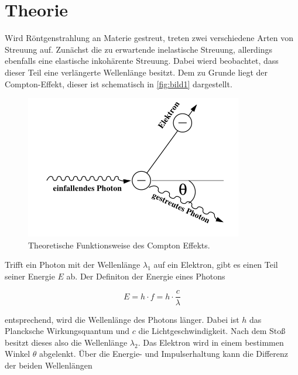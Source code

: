 \section{Theorie}
\label{sec:Theorie}

Wird Röntgenstrahlung an Materie gestreut, treten zwei verschiedene Arten von Streuung auf.
Zunächst die zu erwartende inelastische Streuung, allerdings ebenfalls eine elastische inkohärente Streuung.
Dabei wierd beobachtet, dass dieser Teil eine verlängerte Wellenlänge besitzt.
Dem zu Grunde liegt der Compton-Effekt, dieser ist schematisch in \autoref{fig:bild1} dargestellt.

\begin{figure}
    \centering
    \includegraphics[width=\textwidth/2]{images/bild1.png}
    \caption{Theoretische Funktionsweise des Compton Effekts. \cite{V603}}
    \label{fig:bild1}
\end{figure}

Trifft ein Photon mit der Wellenlänge $\lambda _1$ auf ein Elektron, gibt es einen Teil seiner Energie $E$ ab.
Der Definiton der Energie eines Photons

\begin{equation}
    E = h \cdot f = h \cdot \frac{c}{\lambda}
    \label{eq:energie}
\end{equation}

entsprechend, wird die Wellenlänge des Photons länger.
Dabei ist $h$ das Plancksche Wirkungsquantum und $c$ die Lichtgeschwindigkeit.
Nach dem Stoß besitzt dieses also die Wellenlänge $\lambda _2$.
Das Elektron wird in einem bestimmen Winkel $\theta$ abgelenkt.
Über die Energie- und Impulserhaltung kann die Differenz der beiden Wellenlängen 

